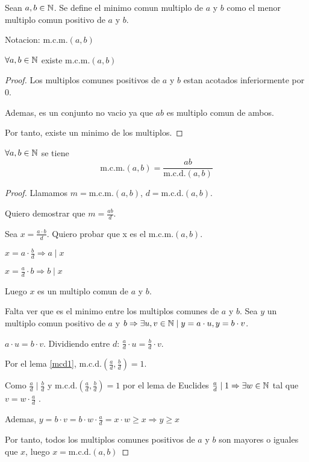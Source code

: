\begin{definition}
	Sean \(a,b \in \mathbb{N}\). Se define el minimo comun multiplo de \(a \) y \(b \) como el menor multiplo comun positivo de \(a \) y \(b \).
	
	Notacion: \(\mathrm{m.c.m.}(a,b) \)
\end{definition}

\begin{proposition}
	\(\forall a,b \in \mathbb{N} \) existe \(\mathrm{m.c.m.}(a,b) \)
\end{proposition}
\begin{proof}
	Los multiplos comunes positivos de \(a \) y \(b \) estan acotados inferiormente por 0.
	
	Ademas, es un conjunto no vacio ya que \(ab \) es multiplo comun de ambos.
	
	Por tanto, existe un minimo de los multiplos.
\end{proof}


\begin{proposition}
	\(\forall a,b \in \mathbb{N} \) se tiene
	\[
		\mathrm{m.c.m.}(a,b) = \frac{ab }{\mathrm{m.c.d.}(a,b) }
	\]
	
\end{proposition}
\begin{proof}
	Llamamos \(m = \mathrm{m.c.m.}(a,b)  \), \(d = \mathrm{m.c.d.}(a,b) \).
	
	Quiero demostrar que \(m = \frac{ab }{d }\).
	
	Sea \(x = \frac{a \cdot b }{d }\). Quiero probar que x es el \(\mathrm{m.c.m.}(a,b ) \).
	
	\(x = a \cdot \frac{b}{d }\Rightarrow a \mid x\)
	
	\(x = \frac{a}{d}\cdot b \Rightarrow b \mid x \)
	
	Luego \(x \) es un multiplo comun de \(a \) y \(b \).
	
	Falta ver que es el minimo entre los multiplos comunes de \(a \) y \(b\).
	Sea \(y \) un multiplo comun positivo de \(a \) y \(b \Rightarrow \exists u,v \in \mathbb{N} \mid y = a \cdot u, y = b \cdot v\).
	
	\(a \cdot u = b \cdot v \). Dividiendo entre \(d \): \(\frac{a}{d} \cdot u = \frac{b}{d} \cdot v \).
	
	Por el lema \ref{mcd1}, \(\mathrm{m.c.d.}(\frac{a}{d},\frac{b}{d}) = 1 \).
	
	Como \(\frac{a}{d} \mid \frac{b}{d }\) y \(\mathrm{m.c.d.}(\frac{a}{d}, \frac{b}{d}) = 1 \) por el lema de Euclides \(\frac{a}{d} \mid 1 \Rightarrow \exists w \in \mathbb{N}\) tal que \(v = w \cdot \frac{a}{d}\) .
	
	Ademas, \(y = b \cdot v = b \cdot w \cdot \frac{a}{d} = x \cdot w \geq x \Rightarrow y \geq x\)
	
	Por tanto, todos los multiplos comunes positivos de \(a\) y \(b \) son mayores o iguales que \(x \), luego \(x = \mathrm{m.c.d.}(a,b) \)
\end{proof}

